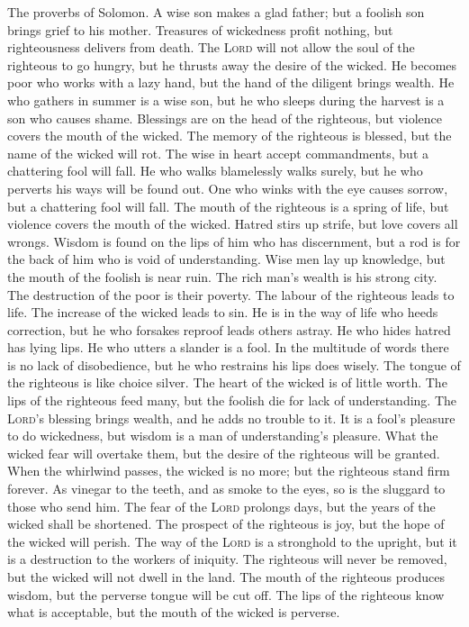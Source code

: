  The proverbs of Solomon. A wise son makes a glad father;
but a foolish son brings grief to his mother.  Treasures
of wickedness profit nothing, but righteousness delivers from death.
 The \textsc{Lord} will not allow the soul of the
righteous to go hungry, but he thrusts away the desire of the wicked.
 He becomes poor who works with a lazy hand, but the hand
of the diligent brings wealth.  He who gathers in summer
is a wise son, but he who sleeps during the harvest is a son who causes
shame.  Blessings are on the head of the righteous, but
violence covers the mouth of the wicked.  The memory of
the righteous is blessed, but the name of the wicked will rot.
 The wise in heart accept commandments, but a chattering
fool will fall.  He who walks blamelessly walks surely,
but he who perverts his ways will be found out.  One who
winks with the eye causes sorrow, but a chattering fool will fall.
 The mouth of the righteous is a spring of life, but
violence covers the mouth of the wicked.  Hatred stirs up
strife, but love covers all wrongs.  Wisdom is found on
the lips of him who has discernment, but a rod is for the back of him
who is void of understanding.  Wise men lay up knowledge,
but the mouth of the foolish is near ruin.  The rich
man's wealth is his strong city. The destruction of the poor is their
poverty.  The labour of the righteous leads to life. The
increase of the wicked leads to sin.  He is in the way of
life who heeds correction, but he who forsakes reproof leads others
astray.  He who hides hatred has lying lips. He who
utters a slander is a fool.  In the multitude of words
there is no lack of disobedience, but he who restrains his lips does
wisely.  The tongue of the righteous is like choice
silver. The heart of the wicked is of little worth.  The
lips of the righteous feed many, but the foolish die for lack of
understanding.  The \textsc{Lord}'s blessing brings
wealth, and he adds no trouble to it.  It is a fool's
pleasure to do wickedness, but wisdom is a man of understanding's
pleasure.  What the wicked fear will overtake them, but
the desire of the righteous will be granted.  When the
whirlwind passes, the wicked is no more; but the righteous stand firm
forever.  As vinegar to the teeth, and as smoke to the
eyes, so is the sluggard to those who send him.  The fear
of the \textsc{Lord} prolongs days, but the years of the wicked shall be
shortened.  The prospect of the righteous is joy, but the
hope of the wicked will perish.  The way of the
\textsc{Lord} is a stronghold to the upright, but it is a destruction to
the workers of iniquity.  The righteous will never be
removed, but the wicked will not dwell in the land.  The
mouth of the righteous produces wisdom, but the perverse tongue will be
cut off.  The lips of the righteous know what is
acceptable, but the mouth of the wicked is perverse.

